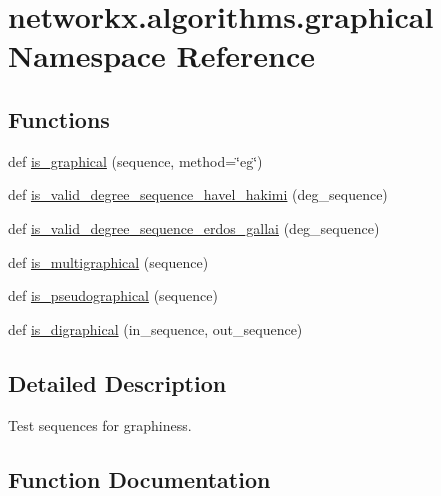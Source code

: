 \hypertarget{namespacenetworkx_1_1algorithms_1_1graphical}{}\section{networkx.\+algorithms.\+graphical Namespace Reference}
\label{namespacenetworkx_1_1algorithms_1_1graphical}
\subsection*{Functions}
\begin{DoxyCompactItemize}
\item 
def \hyperlink{namespacenetworkx_1_1algorithms_1_1graphical_a12a31175e624d480023ceb0defee47b9}{is\+\_\+graphical} (sequence, method=\char`\"{}eg\char`\"{})
\item 
def \hyperlink{namespacenetworkx_1_1algorithms_1_1graphical_ae89906b429041d2b846aa372fdc4a427}{is\+\_\+valid\+\_\+degree\+\_\+sequence\+\_\+havel\+\_\+hakimi} (deg\+\_\+sequence)
\item 
def \hyperlink{namespacenetworkx_1_1algorithms_1_1graphical_a27f77443e8204c7a57ea1fd41b56b86f}{is\+\_\+valid\+\_\+degree\+\_\+sequence\+\_\+erdos\+\_\+gallai} (deg\+\_\+sequence)
\item 
def \hyperlink{namespacenetworkx_1_1algorithms_1_1graphical_ad8f62b18333b9b46eb158b4ea15b9a8c}{is\+\_\+multigraphical} (sequence)
\item 
def \hyperlink{namespacenetworkx_1_1algorithms_1_1graphical_ac9f720f881776738444ef4dcbab3cf2e}{is\+\_\+pseudographical} (sequence)
\item 
def \hyperlink{namespacenetworkx_1_1algorithms_1_1graphical_a2ecbe117263a08ea28a1e807444d5375}{is\+\_\+digraphical} (in\+\_\+sequence, out\+\_\+sequence)
\end{DoxyCompactItemize}


\subsection{Detailed Description}
\begin{DoxyVerb}Test sequences for graphiness.
\end{DoxyVerb}
 

\subsection{Function Documentation}
\mbox{\label{namespacenetworkx_1_1algorithms_1_1graphical_a2ecbe117263a08ea28a1e807444d5375}} 
